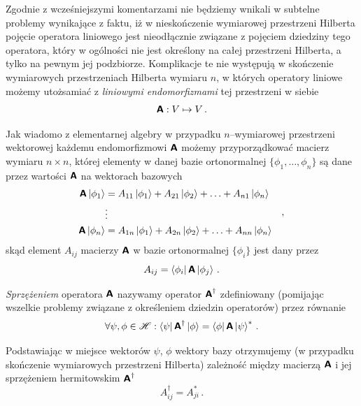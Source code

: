 \documentclass{myclass}
\begin{document}
Zgodnie z wcześniejszymi komentarzami nie będziemy wnikali w subtelne problemy wynikające z faktu,
iż w nieskończenie wymiarowej przestrzeni Hilberta pojęcie operatora liniowego jest nieodłącznie
związane z pojęciem dziedziny tego operatora, który w ogólności nie jest określony na całej
przestrzeni Hilberta, a tylko na pewnym jej podzbiorze. Komplikacje te nie występują w skończenie
wymiarowych przestrzeniach Hilberta wymiaru \(n\), w których operatory liniowe możemy utożsamiać z
\textit{liniowymi endomorfizmami} tej przestrzeni w siebie
\begin{equation*}
\boldsymbol{\mathsf{A}}: V \mapsto V\,.
\end{equation*}

Jak wiadomo z elementarnej algebry w przypadku \(n\)--wymiarowej przestrzeni wektorowej każdemu
endomorfizmowi \(\boldsymbol{\mathsf{A}}\) możemy przyporządkować macierz wymiaru \(n\times n\), której elementy w
danej bazie ortonormalnej \(\{\phi_1,\ldots,\phi_n\}\) są dane przez wartości \(\boldsymbol{\mathsf{A}}\) na
wektorach bazowych
\begin{equation*}
\begin{split}
\boldsymbol{\mathsf{A}}\ket{\phi_1} &= A_{11}\ket{\phi_1} + A_{21}\ket{\phi_2} + \ldots + A_{n1}\ket{\phi_n}\\
&\vdots\\
\boldsymbol{\mathsf{A}}\ket{\phi_n} &= A_{1n}\ket{\phi_1} + A_{2n}\ket{\phi_2} + \ldots + A_{nn}\ket{\phi_n}
\end{split}\quad,
\end{equation*}
skąd element \(A_{ij}\) macierzy \(\boldsymbol{\mathsf{A}}\) w bazie ortonormalnej \(\{\phi_i\}\) jest dany przez
\begin{equation*}
A_{ij} = \bra{\phi_i}\boldsymbol{\mathsf{A}}\ket{\phi_j}\,.
\end{equation*}

\begin{definition}
\textit{Sprzężeniem} operatora \(\boldsymbol{\mathsf{A}}\) nazywamy operator \(\boldsymbol{\mathsf{A}}^\dagger\) zdefiniowany
(pomijając wszelkie problemy związane z określeniem dziedzin operatorów) przez równanie
\begin{equation*}
\forall \psi,\phi\in\mathscr{H}: \bra{\psi}\boldsymbol{\mathsf{A}}^\dagger\ket{\phi} = \bra{\phi}\boldsymbol{\mathsf{A}}\ket{\psi}^*\,.
\end{equation*}
\end{definition}

Podstawiając w miejsce wektorów \(\psi\), \(\phi\) wektory bazy otrzymujemy (w przypadku skończenie
wymiarowych przestrzeni Hilberta) zależność między macierzą \(\boldsymbol{\mathsf{A}}\) i jej sprzężeniem
hermitowskim \(\boldsymbol{\mathsf{A}}^\dagger\)
\begin{equation*}
A^\dagger_{ij} = A_{ji}^*\,.
\end{equation*} 
\end{document}
